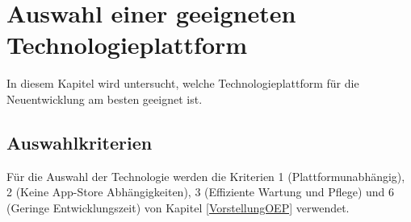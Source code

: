 \documentclass[ngerman]{article}
\begin{document}
    \newpage\noindent
    \section{Auswahl einer geeigneten Technologieplattform}
    \label{AuswahlTechnologieplattform}
    In diesem Kapitel wird untersucht, welche Technologieplattform für die Neuentwicklung am besten geeignet ist.
    \subsection{Auswahlkriterien}
    Für die Auswahl der Technologie werden die Kriterien 1 (Plattformunabhängig), 2 (Keine App-Store Abhängigkeiten), 3 (Effiziente Wartung und Pflege) und 6 (Geringe Entwicklungszeit) von Kapitel \ref{VorstellungOEP} verwendet.
\end{document}
